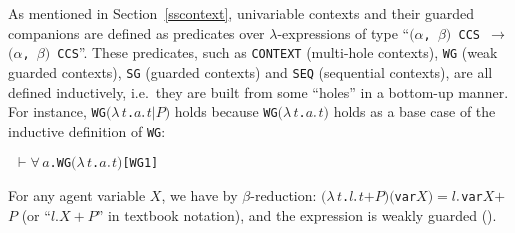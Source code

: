 \documentclass[GCNS]{yincog}
\renewcommand{\HOLinline}[1]{\mbox{\textup{\texttt{#1}}}}
\renewcommand{\HOLConst}[1]{\texttt{#1}}
\renewcommand{\HOLTyOp}[1]{\texttt{#1}}
\renewcommand{\HOLBoundVar}[1]{\ensuremath{\mathit{#1}}}
\renewcommand{\HOLFreeVar}[1]{\ensuremath{\mathit{#1}}}
\renewcommand{\HOLSymConst}[1]{#1}
\renewcommand{\HOLTokenForall}{\ensuremath{\forall \,}}
\renewcommand{\HOLTokenLambda}{\ensuremath{\lambda \,}}
\renewcommand{\HOLTokenTurnstile}{\ensuremath{\:\:\vdash}}
\theoremstyle{remark}
\theoremstyle{theorem}
\theoremstyle{remark}
\newcommand{\HOLTokenTransEnd}{$\rightarrow$\xspace}
\newcommand{\univariate}{univariable\xspace}
\begin{document}
As mentioned in Section~\ref{sscontext}, \univariate contexts and their
guarded companions are defined as predicates over $\lambda $-expressions
of type ``\HOLinline{\ensuremath{(}\ensuremath{\alpha}, \ensuremath{\beta}\ensuremath{)} \HOLTyOp{CCS} \HOLTokenTransEnd \ensuremath{(}\ensuremath{\alpha}, \ensuremath{\beta}\ensuremath{)} \HOLTyOp{CCS}}''.
These predicates, such as \HOLinline{\HOLConst{CONTEXT}} (multi-hole contexts),
\HOLinline{\HOLConst{WG}} (weak guarded contexts),
\HOLinline{\HOLConst{SG}} (guarded contexts) and
\HOLinline{\HOLConst{SEQ}} (sequential contexts), are all defined inductively,
i.e.~they are built from some ``holes'' in a bottom-up manner. For instance,
\HOLinline{\HOLConst{WG}\\\;\ensuremath{(}\HOLTokenLambda{}\HOLBoundVar{t}.\\\;\HOLFreeVar{a}\HOLSymConst{\ensuremath{\ldotp}}\HOLBoundVar{t}\\\;\HOLSymConst{\ensuremath{\mid}}\\\;\HOLFreeVar{P}\ensuremath{)}}
holds because
\HOLinline{\HOLConst{WG}\\\;\ensuremath{(}\HOLTokenLambda{}\HOLBoundVar{t}.\\\;\HOLFreeVar{a}\HOLSymConst{\ensuremath{\ldotp}}\HOLBoundVar{t}\ensuremath{)}}
holds as a base case of the inductive definition of
\HOLinline{\HOLConst{WG}}:
%
\begin{alltt}
\HOLTokenTurnstile{} \HOLSymConst{\HOLTokenForall{}}\HOLBoundVar{a}. \HOLConst{WG} \ensuremath{(}\HOLTokenLambda{}\HOLBoundVar{t}. \HOLBoundVar{a}\HOLSymConst{\ensuremath{\ldotp}}\HOLBoundVar{t}\ensuremath{)}\hfill{[WG1]}
\end{alltt}
%
For any agent variable $X$, we have by $\beta $-reduction:
\HOLinline{\ensuremath{(}\HOLTokenLambda{}\HOLBoundVar{t}.\\\;\HOLFreeVar{l}\HOLSymConst{\ensuremath{\ldotp}}\HOLBoundVar{t}\\\;\HOLSymConst{\ensuremath{+}}\\\;\HOLFreeVar{P}\ensuremath{)}\\\;\ensuremath{(}\HOLConst{var}\\\;\HOLFreeVar{X}\ensuremath{)}\\\;\HOLSymConst{\ensuremath{=}}\\\;\HOLFreeVar{l}\HOLSymConst{\ensuremath{\ldotp}}\HOLConst{var}\\\;\HOLFreeVar{X}\\\;\HOLSymConst{\ensuremath{+}}\\\;\HOLFreeVar{P}}
(or ``$l.X + P$'' in textbook notation), and the expression is weakly guarded
().
\end{document}
